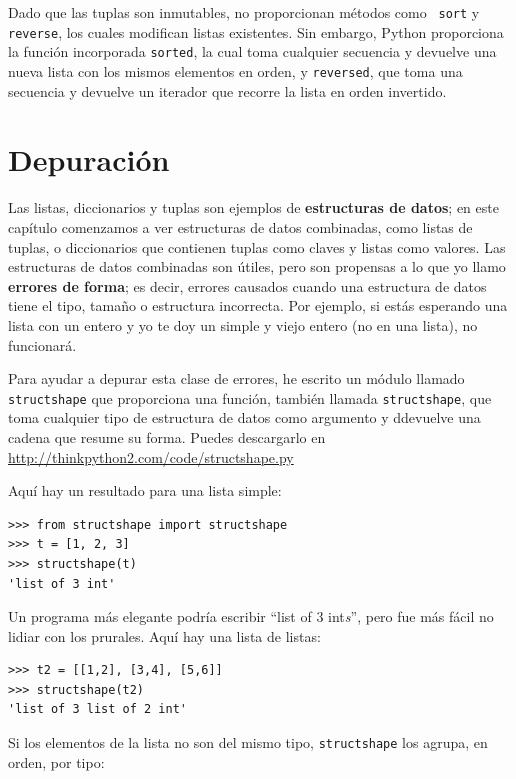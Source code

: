 \documentclass[10pt]{book}
\begin{document}
Dado que las tuplas son inmutables, no proporcionan métodos como {\tt
  sort} y {\tt reverse}, los cuales modifican listas existentes.  Sin embargo, Python
proporciona la función incorporada {\tt sorted}, la cual toma cualquier secuencia
y devuelve una nueva lista con los mismos elementos en orden, y
{\tt reversed}, que toma una secuencia y devuelve un iterador que
recorre la lista en orden invertido.
 


\section{Depuración}

Las listas, diccionarios y tuplas son ejemplos de {\bf estructuras
  de datos}; en este capítulo comenzamos a ver estructuras de datos
combinadas, como listas de tuplas, o diccionarios que contienen tuplas
como claves y listas como valores.  Las estructuras de datos combinadas son útiles,
pero son propensas a lo que yo llamo {\bf errores de forma}; es decir, errores
causados cuando una estructura de datos tiene el tipo, tamaño o estructura
incorrecta. Por ejemplo, si estás esperando una lista con un entero y yo
te doy un simple y viejo entero (no en una lista), no funcionará.

Para ayudar a depurar esta clase de errores, he escrito un módulo
llamado {\tt structshape} que proporciona una función, también llamada
{\tt structshape}, que toma cualquier tipo de estructura de datos como
argumento y ddevuelve una cadena que resume su forma.
Puedes descargarlo en \url{http://thinkpython2.com/code/structshape.py}

Aquí hay un resultado para una lista simple:

\begin{verbatim}
>>> from structshape import structshape
>>> t = [1, 2, 3]
>>> structshape(t)
'list of 3 int'
\end{verbatim}
%
Un programa más elegante podría escribir ``list of 3 int{\em s}'', pero
fue más fácil no lidiar con los prurales.  Aquí hay una lista de listas:

\begin{verbatim}
>>> t2 = [[1,2], [3,4], [5,6]]
>>> structshape(t2)
'list of 3 list of 2 int'
\end{verbatim}
%
Si los elementos de la lista no son del mismo tipo,
{\tt structshape} los agrupa, en orden, por tipo:
\end{document}
